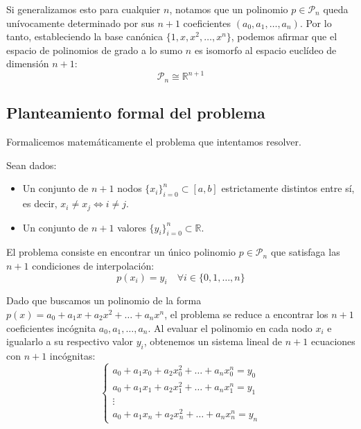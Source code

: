 Si generalizamos esto para cualquier $n$, notamos que un polinomio $p \in \mathcal{P}_n$ queda unívocamente determinado por sus $n+1$ coeficientes $(a_0, a_1, \ldots, a_n)$. Por lo tanto, estableciendo la base canónica $\{1, x, x^2, \ldots, x^n\}$, podemos afirmar que el espacio de polinomios de grado a lo sumo $n$ es isomorfo al espacio euclídeo de dimensión $n+1$:
\[
    \mathcal{P}_n \cong \mathbb{R}^{n+1}
\]

\subsection{Planteamiento formal del problema}

Formalicemos matemáticamente el problema que intentamos resolver.

\begin{definición}
    Sean dados:
    \begin{itemize}
        \item Un conjunto de $n+1$ nodos $\{ x_i \}_{i=0}^n \subset [a,b]$ estrictamente distintos entre sí, es decir, $x_i \neq x_j \iff i \neq j$.
        \item Un conjunto de $n+1$ valores $\{ y_i \}_{i=0}^n \subset \mathbb{R}$.
    \end{itemize}
    El problema consiste en encontrar un único polinomio $p \in \mathcal{P}_n$ que satisfaga las $n+1$ condiciones de interpolación:
    \[
        p(x_i) = y_i \quad \forall i \in \{0, 1, \ldots, n\}
    \]
\end{definición}

Dado que buscamos un polinomio de la forma $p(x) = a_0 + a_1 x + a_2 x^2 + \ldots + a_n x^n$, el problema se reduce a encontrar los $n+1$ coeficientes incógnita $a_0, a_1, \ldots, a_n$. Al evaluar el polinomio en cada nodo $x_i$ e igualarlo a su respectivo valor $y_i$, obtenemos un sistema lineal de $n+1$ ecuaciones con $n+1$ incógnitas:
\[
    \begin{cases}
        a_0 + a_1 x_0 + a_2 x_0^2 + \ldots + a_n x_0^n = y_0 \\
        a_0 + a_1 x_1 + a_2 x_1^2 + \ldots + a_n x_1^n = y_1 \\
        \vdots \\
        a_0 + a_1 x_n + a_2 x_n^2 + \ldots + a_n x_n^n = y_n
    \end{cases}
\]

